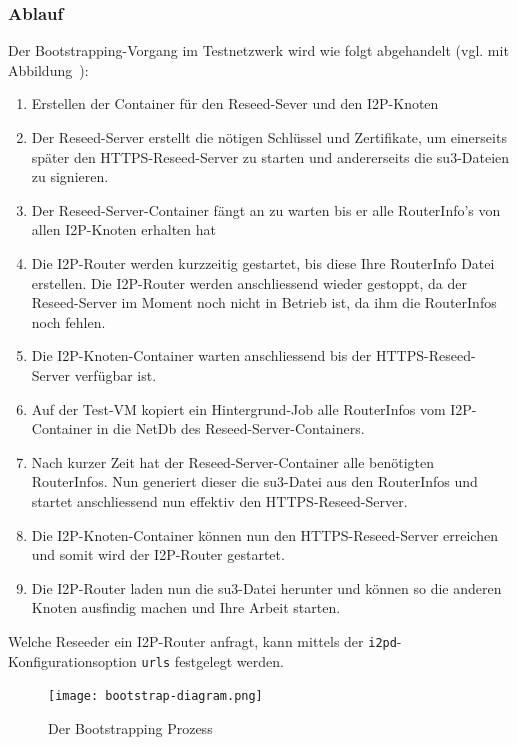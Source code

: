 
\subsubsection{Ablauf}

Der Bootstrapping-Vorgang im Testnetzwerk wird wie folgt abgehandelt (vgl. mit Abbildung~):

\begin{enumerate}
    \item Erstellen der Container für den Reseed-Sever und den I2P-Knoten
    \item Der Reseed-Server erstellt die nötigen Schlüssel und Zertifikate, um einerseits später den HTTPS-Reseed-Server zu starten und andererseits die su3-Dateien zu signieren.
    \item Der Reseed-Server-Container fängt an zu warten bis er alle RouterInfo's von allen I2P-Knoten erhalten hat
    \item Die I2P-Router werden kurzzeitig gestartet, bis diese Ihre RouterInfo Datei erstellen. Die I2P-Router werden anschliessend wieder gestoppt, da der Reseed-Server im Moment noch nicht in Betrieb ist, da ihm die RouterInfos noch fehlen.
    \item Die I2P-Knoten-Container warten anschliessend bis der HTTPS-Reseed-Server verfügbar ist.
    \item Auf der Test-VM kopiert ein Hintergrund-Job alle RouterInfos vom I2P-Container in die NetDb des Reseed-Server-Containers.
    \item Nach kurzer Zeit hat der Reseed-Server-Container alle benötigten RouterInfos. Nun generiert dieser die su3-Datei aus den RouterInfos und startet anschliessend nun effektiv den HTTPS-Reseed-Server.
    \item Die I2P-Knoten-Container können nun den HTTPS-Reseed-Server erreichen und somit wird der I2P-Router gestartet.
    \item Die I2P-Router laden nun die su3-Datei herunter und können so die anderen Knoten ausfindig machen und Ihre Arbeit starten.
\end{enumerate}

Welche Reseeder ein I2P-Router anfragt, kann mittels der \lstinline|i2pd|-Konfigurationsoption \lstinline|urls| festgelegt werden.

\begin{landscape}%
\begin{figure}[ht]
  \texttt{[image: bootstrap-diagram.png]}
  \caption{Der Bootstrapping Prozess}\label{fig:bootstrap-diagram}
\end{figure}
\end{landscape}%

